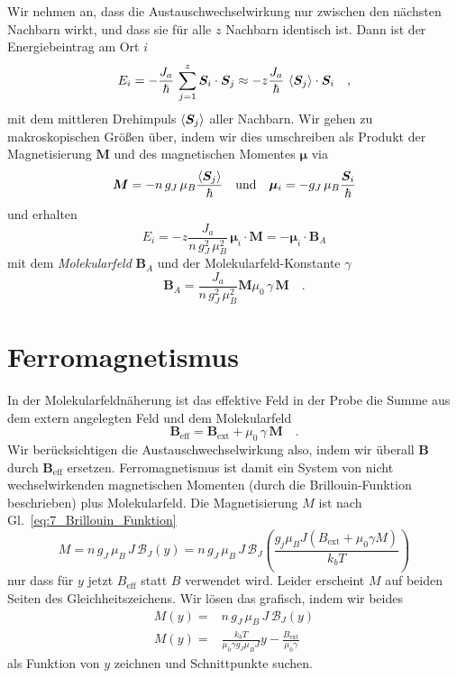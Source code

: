 Wir nehmen an, dass die Austauschwechselwirkung nur zwischen den nächsten Nachbarn wirkt, und dass sie für alle $z$  Nachbarn identisch ist. Dann ist der Energiebeintrag am Ort $i$
\begin{equation}
    E_i = - \frac{J_a}{\hbar} \, \sum_{j=1}^z \bm{S}_i \cdot \bm{S}_j 
    \approx
    - z \frac{J_a}{\hbar} \, \braket{\bm{S}_j} \cdot \bm{S}_i   \quad ,
\end{equation}
mit dem mittleren Drehimpuls $ \braket{\bm{S}_j}$ aller Nachbarn. Wir gehen zu makroskopischen Größen über, indem wir dies umschreiben als Produkt der Magnetisierung $\bm{M}$ und des magnetischen Momentes $\bm{\mu}$ via 
\begin{equation}
    \bm{M} = - n \, g_J \, \mu_B \frac{ \braket{\bm{S}_j}}{\hbar}
    \quad \text{und} \quad
    \bm{\mu}_i = - g_J  \, \mu_B \frac{ \bm{S}_i}{\hbar}
\end{equation}
und erhalten
\begin{equation}
    E_i  = - z \frac{J_a}{n \, g_J^2 \, \mu_B^2} \, \bm{\mu}_i  \cdot \bm{M}  = - \bm{\mu}_i \cdot \bm{B}_A
\end{equation}
mit dem \emph{Molekularfeld} $\bm{B}_A$ und der Molekularfeld-Konstante $\gamma$
\begin{equation}
    \bm{B}_A = \frac{J_a}{n \, g_J^2 \, \mu_B^2} \bm{M} 
   \mu_0 \, \gamma \, \bm{M}   \quad . 
\end{equation}

\section*{Ferromagnetismus}

In  der Molekularfeldnäherung ist das effektive Feld in der Probe die Summe aus dem extern angelegten Feld und dem Molekularfeld
\begin{equation}
    \bm{B}_\text{eff} = \bm{B}_\text{ext} +  \mu_0 \, \gamma \, \bm{M}  \quad .
\end{equation}
Wir berücksichtigen die Austauschwechselwirkung also, indem wir überall $\bm{B}$ durch $\bm{B}_\text{eff}$ ersetzen. Ferromagnetismus ist damit ein System von nicht wechselwirkenden magnetischen Momenten (durch die Brillouin-Funktion beschrieben) plus Molekularfeld. Die Magnetisierung $M$ ist nach Gl.~\ref{eq:7_Brillouin_Funktion}
\begin{equation}
    M = n \, g_J \, \mu_B \, J \, \mathcal{B}_J(y)
    =  n \, g_J \, \mu_B \, J \, \mathcal{B}_J \left( \frac{g_j \mu_B J (B_\text{ext} + \mu_0 \gamma M)}{k_b T} \right)
\end{equation}
nur dass für $y$ jetzt $B_\text{eff}$ statt $B$ verwendet wird. Leider erscheint $M$ auf beiden Seiten des Gleichheitszeichens. Wir lösen das grafisch, indem wir beides 
\begin{eqnarray}
    M(y) = & n \, g_J \, \mu_B \, J \, \mathcal{B}_J(y)  \label{eq:7_inters1}\\
    M(y) =  & \frac{k_b T}{\mu_0 \gamma g_J \mu_B J} y - \frac{B_\text{ext}}{\mu_0 \gamma}  \label{eq:7_inters2}
\end{eqnarray}
als Funktion von $y$ zeichnen und Schnittpunkte suchen.


